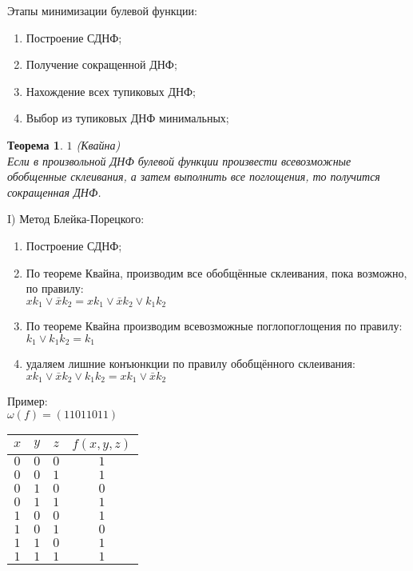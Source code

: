 \documentclass[a4paper, 12pt]{report}
\newtheorem*{theorem}{Теорема} %
\begin{document}
Этапы минимизации булевой функции:
\begin{enumerate}
	\item Построение СДНФ;
	\item Получение сокращенной ДНФ;
	\item Нахождение всех тупиковых ДНФ;
	\item Выбор из тупиковых ДНФ минимальных;
\end{enumerate}
\begin{theorem} $1$ (Квайна)\\
	Если в произвольной ДНФ булевой функции произвести всевозможные обобщенные склеивания, а затем выполнить все поглощения, то получится сокращенная ДНФ.
\end{theorem}
I) \quad Метод Блейка-Порецкого:
\begin{enumerate}
	\item Построение СДНФ;
	\item По теореме Квайна, производим все обобщённые склеивания, пока возможно, по правилу:\\
	$xk_1 \vee \bar x k_2 = xk_1 \vee \bar x k_2\vee k_1k_2$ 
	\item По теореме Квайна производим всевозможные поглопоглощения по правилу:\\
	$k_1 \vee k_1k_2 = k_1$
	\item удаляем лишние конъюнкции по правилу обобщённого склеивания:\\
	$xk_1 \vee \bar x k_2 \vee k_1k_2 = xk_1 \vee \bar x k_2$
\end{enumerate}
Пример:\\
$\omega(f)=(11011011)$\\
\begin{tabular}{|c|c|c|c|}
	\hline
	$x$ & $y$ & $z$ & $f(x, y, z)$ \\
	\hline
	$0$ & $0$ & $0$ & $1$ \\
	$0$ & $0$ & $1$ & $1$ \\
	$0$ & $1$ & $0$ & $0$ \\
	$0$ & $1$ & $1$ & $1$ \\
	$1$ & $0$ & $0$ & $1$ \\
	$1$ & $0$ & $1$ & $0$ \\
	$1$ & $1$ & $0$ & $1$ \\
	$1$ & $1$ & $1$ & $1$ \\
	\hline
\end{tabular}\\
\end{document}
